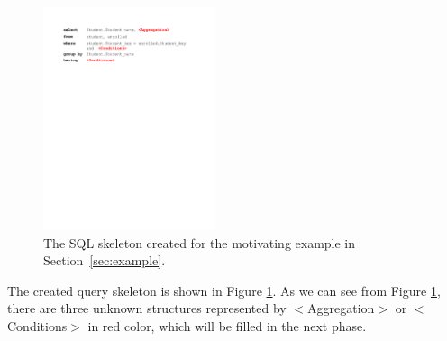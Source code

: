 \begin{figure}[t]
	\centering
		\includegraphics[width=0.45\textwidth]{sql_skeleton.pdf}
	\caption{The SQL skeleton created for the motivating example
in Section~\ref{sec:example}.}
	\label{fig:skeleton}
\end{figure}

The created query skeleton  is shown in Figure \ref{fig:skeleton}.
As we can see from Figure \ref{fig:skeleton},  there are three unknown structures represented
by $<$Aggregation$>$ or $<$Conditions$>$ in red color, which will be filled in the next phase.
